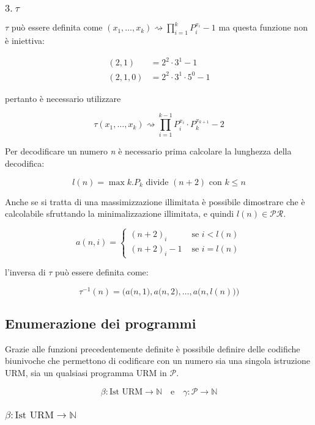 \subsubsection{$3. \: \tau $}

$ \tau $ può essere definita come $ (x_1, \ldots, x_k) \rightsquigarrow \prod\limits_{i=1}^{k} P_{i}^{x_i} -1$ ma questa funzione non è iniettiva:

\begin{align*}
(2,1) &= 2^2 \cdot 3^1 -1 \\
(2,1,0) &= 2^2 \cdot 3^1  \cdot 5^0 -1
\end{align*}

pertanto è necessario utilizzare

$$
\tau(x_1, \ldots, x_k) \rightsquigarrow \prod\limits_{i=1}^{k-1} P_{i}^{x_i} \cdot P_{k}^{x_{k+1}} - 2
$$

Per decodificare un numero \textit{n} è necessario prima calcolare la lunghezza della decodifica:

$$
l(n) = \max k.P_k \text{ divide } (n+2) \text{ con } k \leq n
$$

Anche se si tratta di una massimizzazione illimitata è possibile dimostrare che è calcolabile sfruttando la minimalizzazione illimitata, e quindi $ l(n) \in \mathcal{PR} $.

$$
a(n,i) = \begin{cases}
(n+2)_i &\text{ se } i < l(n)\\
(n+2)_i -1 &\text{ se } i = l(n)
\end{cases}
$$

l'inversa di $ \tau $ può essere definita come:

$$
\tau^{-1}(n) = \Big(a\big(n,1\big), a\big(n,2\big), \ldots, a\big(n,l(n)\big)\Big)
$$

\subsection{Enumerazione dei programmi}

Grazie alle funzioni precedentemente definite è possibile definire delle codifiche biunivoche che permettono di codificare con un numero sia una singola istruzione URM, sia un qualsiasi programma URM in $ \mathcal{P} $.

$$
\beta : \text{Ist URM} \rightarrow \mathbb{N} \quad \text{e} \quad \gamma : \mathcal{P} \rightarrow \mathbb{N}
$$

\subsubsection{$ \beta : \text{Ist URM} \rightarrow \mathbb{N} $}

